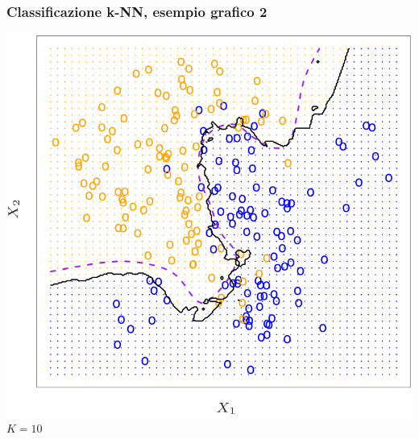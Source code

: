 \begin{frame}
	\frametitle{Classificazione k-NN, esempio grafico 2}
	\begin{center}
		\includegraphics[width=0.5\linewidth]{images/supervised/knn_classification/knn_classification_example_2.png} \\ $K=10$
	\end{center}
\end{frame}

